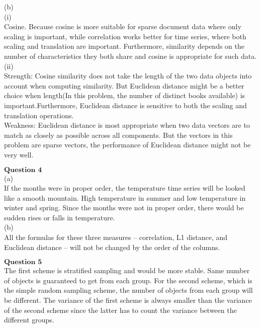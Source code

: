 \documentclass[12pt]{article}
\begin{document}
(b)\\

(i)\\

Cosine. Because cosine is more suitable for sparse document data where
only scaling is important, while correlation works better for time series, where
both scaling and translation are important. Furthermore, similarity depends on the number of characteristics they both share and cosine is appropriate for such data.\\

(ii)\\

Strength: Cosine similarity does not take the
length of the two data objects into account when computing similarity.
But Euclidean distance might be a better choice when length(In this problem, the number of distinct books available) is important.Furthermore, Euclidean distance is sensitive to both the scaling
and translation operations.\\

Weakness: Euclidean distance is most appropriate when two data vectors are to
match as closely as possible across all components. But the vectors in this problem are sparse vectors, the performance of Euclidean distance might not be very well.\\

\newpage

$\textbf{Question 4}$\\

(a)\\

If the months were in proper order, the temperature time series will be looked like a smooth mountain. High temperature in summer and low temperature in winter and spring. Since the months were not in proper order, there would be sudden rises or falls in temperature.\\

(b)\\

All the formulas for these three measures – correlation, L1 distance, and Euclidean distance – will not be changed by the order of the columns.

\newpage

$\textbf{Question 5}$\\

The first scheme is stratified sampling and would be more stable. Same number of objects is guaranteed to get from each group. For the second scheme, which is the simple random sampling scheme, the number of objects from each group will be different. The variance of the first scheme is always smaller than the variance of the second scheme since the latter has to count the variance between the different groups.\\
\end{document}
